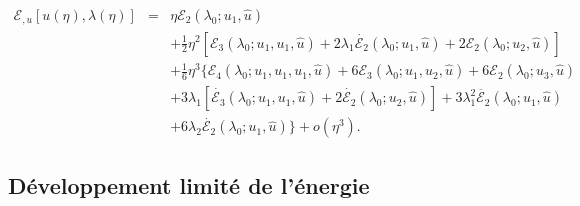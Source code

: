 \documentclass[12pt, final]{amsart}
\begin{document}
\begin{eqnarray}
  \mathcal{E}_{, u} [u (\eta), \lambda (\eta)] & = & \eta \mathcal{E}_2
  (\lambda_0 ; u_1, \hat{u}) \nonumber\\
  &  &  + \tfrac{1}{2} \eta^2  [\mathcal{E}_3 (\lambda_0 ; u_1, u_1,
  \hat{u}) + 2 \lambda_1  \dot{\mathcal{E}_2} (\lambda_0 ; u_1, \hat{u}) +
  2\mathcal{E}_2 (\lambda_0 ; u_2, \hat{u})] \nonumber\\
  &  &  + \tfrac{1}{6} \eta^3  \{ \mathcal{E}_4 (\lambda_0 ; u_1,
  u_1, u_1, \hat{u}) + 6\mathcal{E}_3 (\lambda_0 ; u_1, u_2, \hat{u})
   + 6\mathcal{E}_2 (\lambda_0 ; u_3, \hat{u}) \nonumber\\
  &  &  + 3 \lambda_1  [\dot{\mathcal{E}_3} (\lambda_0 ; u_1, u_1,
  \hat{u}) + 2 \dot{\mathcal{E}_2} (\lambda_0 ; u_2, \hat{u})] + 3 \lambda_1^2
  \ddot{\mathcal{E}_2} (\lambda_0 ; u_1, \hat{u}) \nonumber\\
  &  &   + 6 \lambda_2  \dot{\mathcal{E}_2} (\lambda_0 ;
  u_1, \hat{u}) \} + o (\eta^3) .  \label{eq20220107080901}
\end{eqnarray}
\subsection{D{\'e}veloppement limit{\'e} de
l'{\'e}nergie}\label{sec20220121172919}
\end{document}
